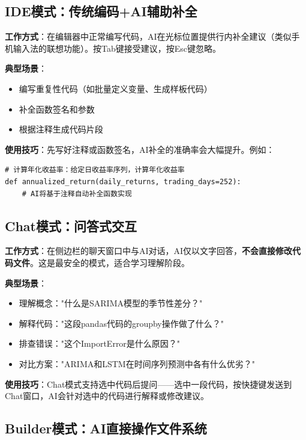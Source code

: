 \subsection{IDE模式：传统编码+AI辅助补全}

\textbf{工作方式}：在编辑器中正常编写代码，AI在光标位置提供行内补全建议（类似手机输入法的联想功能）。按Tab键接受建议，按Esc键忽略。

\textbf{典型场景}：
\begin{itemize}[leftmargin=2em]
  \item 编写重复性代码（如批量定义变量、生成样板代码）
  \item 补全函数签名和参数
  \item 根据注释生成代码片段
\end{itemize}

\textbf{使用技巧}：先写好注释或函数签名，AI补全的准确率会大幅提升。例如：

\begin{lstlisting}[style=python]
# 计算年化收益率：给定日收益率序列，计算年化收益率
def annualized_return(daily_returns, trading_days=252):
    # AI将基于注释自动补全函数实现
\end{lstlisting}

\subsection{Chat模式：问答式交互}

\textbf{工作方式}：在侧边栏的聊天窗口中与AI对话，AI仅以文字回答，\textbf{不会直接修改代码文件}。这是最安全的模式，适合学习理解阶段。

\textbf{典型场景}：
\begin{itemize}[leftmargin=2em]
  \item 理解概念："什么是SARIMA模型的季节性差分？"
  \item 解释代码："这段pandas代码的groupby操作做了什么？"
  \item 排查错误："这个ImportError是什么原因？"
  \item 对比方案："ARIMA和LSTM在时间序列预测中各有什么优劣？"
\end{itemize}

\textbf{使用技巧}：Chat模式支持选中代码后提问——选中一段代码，按快捷键发送到Chat窗口，AI会针对选中的代码进行解释或修改建议。

\subsection{Builder模式：AI直接操作文件系统}

